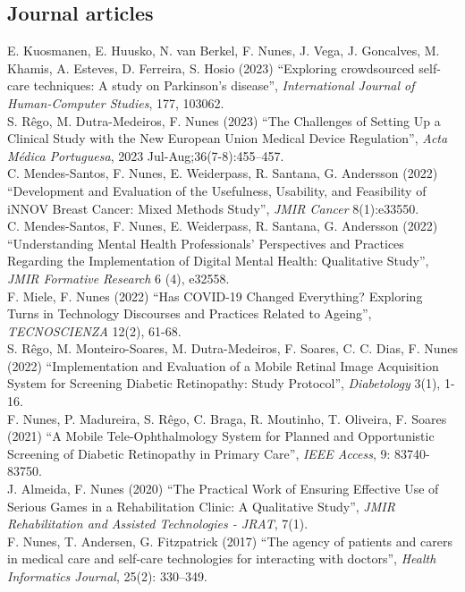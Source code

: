 \documentclass[11pt, a4paper]{article} %
\newcommand{\years}[1]{\marginnote{\scriptsize #1}} %
\begin{document}
\subsection*{Journal articles}
\years{2023}E. Kuosmanen, E. Huusko, N. van Berkel, F. Nunes, J. Vega, J. Goncalves, M. Khamis, A. Esteves, D. Ferreira, S. Hosio (2023) ``Exploring crowdsourced self-care techniques: A study on Parkinson's disease'', \emph{International Journal of Human-Computer Studies}, 177, 103062.\\
\years{2023}S. Rêgo, M. Dutra-Medeiros, F. Nunes (2023) ``The Challenges of Setting Up a Clinical Study with the New European Union Medical Device Regulation'', \emph{Acta Médica Portuguesa}, 2023 Jul-Aug;36(7-8):455--457.\\
\years{2022}C. Mendes-Santos, F. Nunes, E. Weiderpass, R. Santana, G. Andersson (2022) ``Development and Evaluation of the Usefulness, Usability, and Feasibility of iNNOV Breast Cancer: Mixed Methods Study'', \emph{JMIR Cancer} 8(1):e33550.\\
\years{2022}C. Mendes-Santos, F. Nunes, E. Weiderpass, R. Santana, G. Andersson (2022) ``Understanding Mental Health Professionals' Perspectives and Practices Regarding the Implementation of Digital Mental Health: Qualitative Study'', \emph{JMIR Formative Research} 6 (4), e32558.\\
\years{2022}F. Miele, F. Nunes (2022) ``Has COVID-19 Changed Everything? Exploring Turns in Technology Discourses and Practices Related to Ageing'', \emph{TECNOSCIENZA} 12(2), 61-68.\\
\years{2022}S. Rêgo, M. Monteiro-Soares, M. Dutra-Medeiros, F. Soares, C. C. Dias, F. Nunes (2022) ``Implementation and Evaluation of a Mobile Retinal Image Acquisition System for Screening Diabetic Retinopathy: Study Protocol'', \emph{Diabetology} 3(1), 1-16.\\
\years{2021}F. Nunes, P. Madureira, S. Rêgo, C. Braga, R. Moutinho, T. Oliveira, F. Soares (2021) ``A Mobile Tele-Ophthalmology System for Planned and Opportunistic Screening of Diabetic Retinopathy in Primary Care'', \emph{IEEE Access}, 9: 83740-83750.\\
\years{2020}J. Almeida, F. Nunes (2020) ``The Practical Work of Ensuring Effective Use of Serious Games in a Rehabilitation Clinic: A Qualitative Study'', \emph{JMIR Rehabilitation and Assisted Technologies - JRAT}, 7(1).\\
\years{2017}F. Nunes, T. Andersen, G. Fitzpatrick (2017) ``The agency of patients and carers in medical care and self-care technologies for interacting with doctors'', \emph{Health Informatics Journal}, 25(2): 330--349.\\
\end{document}

